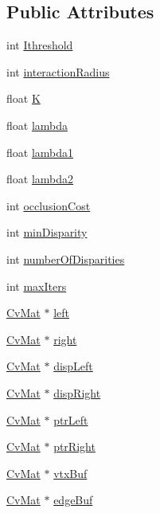 \subsection*{Public Attributes}
\begin{DoxyCompactItemize}
\item 
int \hyperlink{structCvStereoGCState_a3ffcc3ba221a17b5c6a797f193e415ef}{Ithreshold}
\item 
int \hyperlink{structCvStereoGCState_aabf69d788a58964238fb7fd9856c9072}{interaction\-Radius}
\item 
float \hyperlink{structCvStereoGCState_a9235a0cc202d057ea7b7702e27ef5258}{K}
\item 
float \hyperlink{structCvStereoGCState_a9964d61285e7ae6473ea67f37c690686}{lambda}
\item 
float \hyperlink{structCvStereoGCState_a0fcc2b4ab0710f2a908bea3c7215bf37}{lambda1}
\item 
float \hyperlink{structCvStereoGCState_a8a8099aa413d54772f324ffbdf5bf3c4}{lambda2}
\item 
int \hyperlink{structCvStereoGCState_a5180d46f17b0ef1a0a12548f1ac8d131}{occlusion\-Cost}
\item 
int \hyperlink{structCvStereoGCState_acd99c90864d862383ea2ee3d7771bcdf}{min\-Disparity}
\item 
int \hyperlink{structCvStereoGCState_a25f14ac893bf2cc8cfa7f1b71692dbc9}{number\-Of\-Disparities}
\item 
int \hyperlink{structCvStereoGCState_a3e7a32482d880e232b95e6be0d0c0d20}{max\-Iters}
\item 
\hyperlink{structCvMat}{Cv\-Mat} $\ast$ \hyperlink{structCvStereoGCState_a1db1664259831d3dfd963b67d2d1f086}{left}
\item 
\hyperlink{structCvMat}{Cv\-Mat} $\ast$ \hyperlink{structCvStereoGCState_a0de1cdbbff1f05aed8f73b6d0d30dc27}{right}
\item 
\hyperlink{structCvMat}{Cv\-Mat} $\ast$ \hyperlink{structCvStereoGCState_aa42201c55ae54bea97810a913e59eefb}{disp\-Left}
\item 
\hyperlink{structCvMat}{Cv\-Mat} $\ast$ \hyperlink{structCvStereoGCState_a8d1b00fb29ac17a6ba6c49a92dc78147}{disp\-Right}
\item 
\hyperlink{structCvMat}{Cv\-Mat} $\ast$ \hyperlink{structCvStereoGCState_a47a4b2c5e47839d25f45c8214e2a3d61}{ptr\-Left}
\item 
\hyperlink{structCvMat}{Cv\-Mat} $\ast$ \hyperlink{structCvStereoGCState_a72a4375a625d180a8d4670d8f40d8eac}{ptr\-Right}
\item 
\hyperlink{structCvMat}{Cv\-Mat} $\ast$ \hyperlink{structCvStereoGCState_a1fb806f995a7314ace15ace55d061d4e}{vtx\-Buf}
\item 
\hyperlink{structCvMat}{Cv\-Mat} $\ast$ \hyperlink{structCvStereoGCState_a75d3251f2b816ca26bf4ee82780f1394}{edge\-Buf}
\end{DoxyCompactItemize}


